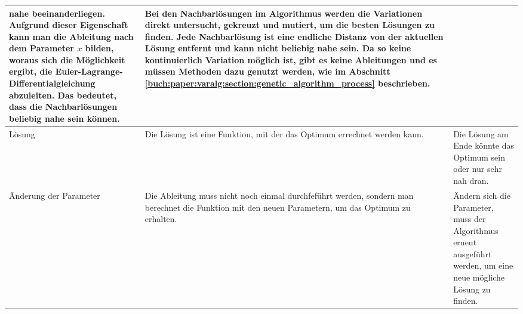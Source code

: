 \begin{xltabular}{\textwidth}{|L|X|X|}
   nahe beeinanderliegen. Aufgrund dieser Eigenschaft kann man die Ableitung nach dem
   Parameter \(x\) bilden, woraus sich die Möglichkeit ergibt, die Euler-Lagrange-Differentialgleichung
   abzuleiten. Das bedeutet, dass die Nachbarlösungen beliebig nahe sein können.  
   & Bei den Nachbarlösungen im Algorithmus werden die Variationen direkt untersucht,
   gekreuzt und mutiert, um die besten Lösungen zu finden. Jede Nachbarlösung 
   ist eine endliche Distanz von der aktuellen Lösung entfernt und kann nicht beliebig 
   nahe sein. Da so keine kontinuierlich Variation möglich ist, gibt es keine Ableitungen
   und es müssen Methoden dazu genutzt werden, wie im Abschnitt 
   \ref{buch:paper:varalg:section:genetic_algorithm_process} beschrieben.
   \\ \hline
   Lösung
   & Die Lösung ist eine Funktion, mit der das Optimum errechnet werden kann.
   & Die Lösung am Ende könnte das Optimum sein oder nur sehr nah dran.
   \\ \hline
   Änderung der Parameter
   & Die Ableitung muss nicht noch einmal durchfeführt werden, sondern man berechnet die 
   Funktion mit den neuen Parametern, um das Optimum zu erhalten.
   & Ändern sich die Parameter, muss der Algorithmus erneut ausgeführt werden, um eine
   neue mögliche Lösung zu finden.
   \\ \hline
\end{xltabular}
